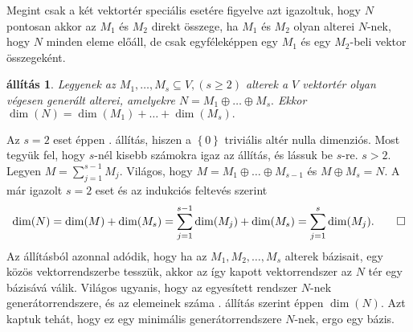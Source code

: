 \documentclass[a4paper, showtrims]{memoir}
\makeatletter
\renewenvironment{proof}[1][\proofname]
    {\par\pushQED{\qed}%
    \normalfont \topsep6\p@\@plus6\p@\relax
    \trivlist
    \item[\hskip\labelsep
        \itshape
    #1\@addpunct{:}]\ignorespaces}
    {\popQED\endtrivlist\@endpefalse}
\theoremstyle{plain}
\newtheorem{proposition}{állítás}[chapter]
\theoremstyle{remark}
\theoremstyle{definition}
\makeatother
\begin{document}
Megint csak a két vektortér speciális esetére figyelve
azt igazoltuk, hogy $N$ pontosan akkor az $M_1$ és $M_2$ direkt összege,
ha $M_1$ és $M_2$ olyan alterei $N$-nek, hogy $N$ minden eleme előáll,
de csak egyféleképpen egy $M_1$ és egy $M_2$-beli vektor összegeként.
\begin{proposition}\label{pr:drosszeg}
	Legyenek az $M_1,\ldots,M_s\subseteq V, (s\geq 2)$ alterek a $V$ vektortér olyan végesen generált alterei,
	amelyekre
	\(
	N=M_1\oplus\dots\oplus M_s.
	\)
	Ekkor
	\(
	\dim(N)=
	\dim(M_1)+\dots+\dim(M_s).
	\)
\end{proposition}
\begin{proof}
    Az $s=2$ eset éppen . állítás,
	hiszen a $\left\{ 0 \right\}$ triviális altér nulla dimenziós.
	Most tegyük fel, hogy $s$-nél kisebb számokra igaz az állítás,
	és lássuk be $s$-re. $s>2.$
	Legyen $M=\sum_{j=1}^{s-1}M_j.$
	Világos, hogy $M=M_1\oplus\dots\oplus M_{s-1}$ és $M\oplus M_s=N$.
	A már igazolt $s=2$ eset és az indukciós feltevés szerint
	\[
		\dim(N)
		=
		\dim(M)+\dim(M_s)
		=
		\sum_{j=1}^{s-1}\dim(M_j)+\dim(M_s)
		=
		\sum_{j=1}^{s}\dim(M_j).\qedhere
	\]
\end{proof}
Az állításból azonnal adódik,
hogy ha az $M_1, M_2, \dots,M_s$ alterek bázisait, egy közös vektorrendszerbe tesszük,
akkor az így kapott vektorrendszer az $N$ tér egy bázisává válik.
Világos ugyanis, hogy az egyesített rendszer $N$-nek generátorrendszere,
és az elemeinek száma . állítás szerint éppen $\dim(N)$.
Azt kaptuk tehát, hogy ez egy minimális generátorrendszere $N$-nek,
ergo egy bázis.
\end{document}
